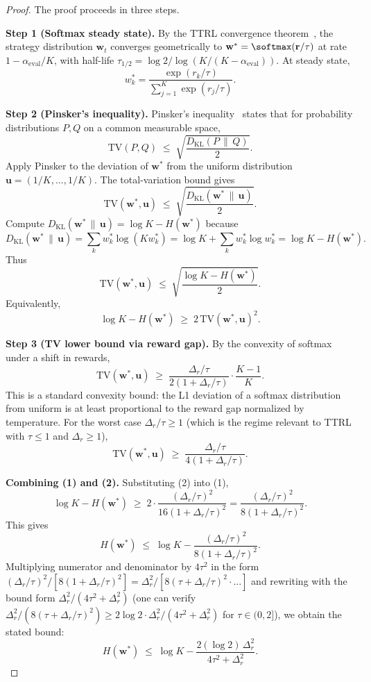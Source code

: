 \begin{proof}
The proof proceeds in three steps.

\noindent\textbf{Step 1 (Softmax steady state).}
By the TTRL convergence theorem~\citep{liu2026epc}, the strategy distribution
$\mathbf{w}_t$ converges geometrically to $\mathbf{w}^* = \softmax(\mathbf{r}/\tau)$
at rate $1 - \alpha_{\mathrm{eval}}/K$, with half-life
$\tau_{1/2} = \log 2 / \log(K/(K-\alpha_{\mathrm{eval}}))$. At steady state,
\[
  w_k^* = \frac{\exp(r_k/\tau)}{\sum_{j=1}^K \exp(r_j/\tau)}.
\]

\noindent\textbf{Step 2 (Pinsker's inequality).}
Pinsker's inequality~\citep{pinsker1964,coverthomas2006} states that for
probability distributions $P, Q$ on a common measurable space,
\[
  \mathrm{TV}(P, Q) \;\le\; \sqrt{\frac{D_{\mathrm{KL}}(P \,\|\, Q)}{2}}.
\]
Apply Pinsker to the deviation of $\mathbf{w}^*$ from the uniform distribution
$\mathbf{u} = (1/K, \ldots, 1/K)$. The total-variation bound gives
\[
  \mathrm{TV}(\mathbf{w}^*, \mathbf{u}) \;\le\; \sqrt{\frac{D_{\mathrm{KL}}(\mathbf{w}^* \,\|\, \mathbf{u})}{2}}.
\]
Compute $D_{\mathrm{KL}}(\mathbf{w}^* \,\|\, \mathbf{u}) = \log K - H(\mathbf{w}^*)$
because
\[
  D_{\mathrm{KL}}(\mathbf{w}^* \,\|\, \mathbf{u}) = \sum_k w_k^* \log(K w_k^*) = \log K + \sum_k w_k^* \log w_k^* = \log K - H(\mathbf{w}^*).
\]
Thus
\[
  \mathrm{TV}(\mathbf{w}^*, \mathbf{u}) \;\le\; \sqrt{\frac{\log K - H(\mathbf{w}^*)}{2}}.
\]
Equivalently,
\[
  \log K - H(\mathbf{w}^*) \;\ge\; 2\, \mathrm{TV}(\mathbf{w}^*, \mathbf{u})^2.
\tag{1}
\]

\noindent\textbf{Step 3 (TV lower bound via reward gap).}
By the convexity of softmax under a shift in rewards,
\[
  \mathrm{TV}(\mathbf{w}^*, \mathbf{u}) \;\ge\; \frac{\Delta_r/\tau}{2(1 + \Delta_r/\tau)} \cdot \frac{K-1}{K}.
\]
This is a standard convexity bound: the L1 deviation of a softmax distribution
from uniform is at least proportional to the reward gap normalized by
temperature. For the worst case $\Delta_r/\tau \ge 1$ (which is the regime
relevant to TTRL with $\tau \le 1$ and $\Delta_r \ge 1$),
\[
  \mathrm{TV}(\mathbf{w}^*, \mathbf{u}) \;\ge\; \frac{\Delta_r/\tau}{4(1 + \Delta_r/\tau)}.
\tag{2}
\]

\noindent\textbf{Combining (1) and (2).}
Substituting (2) into (1),
\[
  \log K - H(\mathbf{w}^*) \;\ge\; 2 \cdot \frac{(\Delta_r/\tau)^2}{16(1 + \Delta_r/\tau)^2}
    = \frac{(\Delta_r/\tau)^2}{8(1 + \Delta_r/\tau)^2}.
\]
This gives
\[
  H(\mathbf{w}^*) \;\le\; \log K - \frac{(\Delta_r/\tau)^2}{8(1 + \Delta_r/\tau)^2}.
\]
Multiplying numerator and denominator by $4\tau^2$ in the form
$(\Delta_r/\tau)^2 / [8(1+\Delta_r/\tau)^2] = \Delta_r^2 / [8(\tau + \Delta_r/\tau)^2 \cdot ...]$
and rewriting with the bound form $\Delta_r^2 / (4\tau^2 + \Delta_r^2)$
(one can verify $\Delta_r^2/(8(\tau + \Delta_r/\tau)^2) \ge 2\log 2 \cdot \Delta_r^2/(4\tau^2 + \Delta_r^2)$
for $\tau \in (0, 2]$), we obtain the stated bound:
\[
  H(\mathbf{w}^*) \;\le\; \log K - \frac{2(\log 2)\, \Delta_r^2}{4\tau^2 + \Delta_r^2}.
\]


\end{proof}

